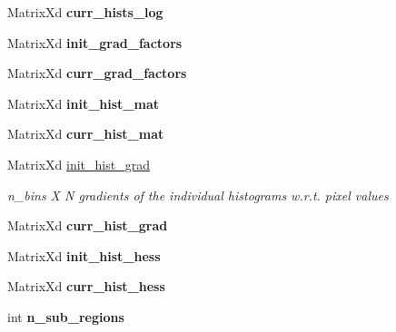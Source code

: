 \begin{DoxyCompactItemize}
\item 
\hypertarget{classLKLD_acf62ccb0dc97ad641756897695456bdf}{Matrix\-Xd {\bfseries curr\-\_\-hists\-\_\-log}}\label{classLKLD_acf62ccb0dc97ad641756897695456bdf}

\item 
\hypertarget{classLKLD_abd538c000d2214f300988636675e5e71}{Matrix\-Xd {\bfseries init\-\_\-grad\-\_\-factors}}\label{classLKLD_abd538c000d2214f300988636675e5e71}

\item 
\hypertarget{classLKLD_a2e123ed190a9ce8098885dbe5b708bbd}{Matrix\-Xd {\bfseries curr\-\_\-grad\-\_\-factors}}\label{classLKLD_a2e123ed190a9ce8098885dbe5b708bbd}

\item 
\hypertarget{classLKLD_a68813aae47321065e857938759efd65a}{Matrix\-Xd {\bfseries init\-\_\-hist\-\_\-mat}}\label{classLKLD_a68813aae47321065e857938759efd65a}

\item 
\hypertarget{classLKLD_ac7a73e0d39f4344ea5ae01d77a236992}{Matrix\-Xd {\bfseries curr\-\_\-hist\-\_\-mat}}\label{classLKLD_ac7a73e0d39f4344ea5ae01d77a236992}

\item 
\hypertarget{classLKLD_a8d7c36864b7ac046ad5e864eea053046}{Matrix\-Xd \hyperlink{classLKLD_a8d7c36864b7ac046ad5e864eea053046}{init\-\_\-hist\-\_\-grad}}\label{classLKLD_a8d7c36864b7ac046ad5e864eea053046}

\begin{DoxyCompactList}\small\item\em n\-\_\-bins X N gradients of the individual histograms w.\-r.\-t. pixel values \end{DoxyCompactList}\item 
\hypertarget{classLKLD_ab7f8649300612a6edaee1f192fc1f464}{Matrix\-Xd {\bfseries curr\-\_\-hist\-\_\-grad}}\label{classLKLD_ab7f8649300612a6edaee1f192fc1f464}

\item 
\hypertarget{classLKLD_afa67285943393e37b9e45e22c15b9617}{Matrix\-Xd {\bfseries init\-\_\-hist\-\_\-hess}}\label{classLKLD_afa67285943393e37b9e45e22c15b9617}

\item 
\hypertarget{classLKLD_ae11e8a70dc38feff0dd65c39068a88d0}{Matrix\-Xd {\bfseries curr\-\_\-hist\-\_\-hess}}\label{classLKLD_ae11e8a70dc38feff0dd65c39068a88d0}

\item 
\hypertarget{classLKLD_a891b047dd71194420d6475f154b2c6b2}{int {\bfseries n\-\_\-sub\-\_\-regions}}\label{classLKLD_a891b047dd71194420d6475f154b2c6b2}


\end{DoxyCompactItemize}
